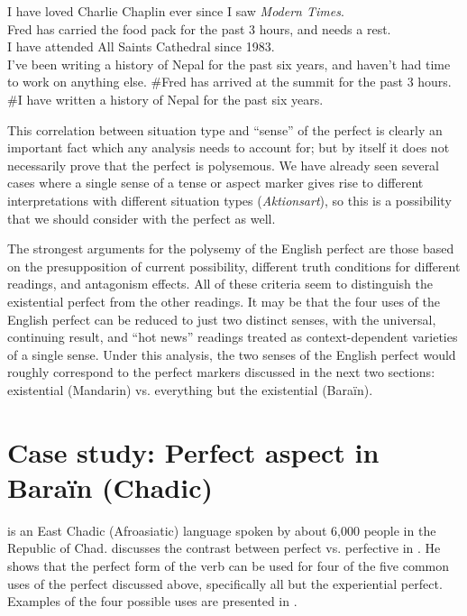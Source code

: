 \ea \label{ex:22.23}
\ea I have loved Charlie Chaplin ever since I saw \textit{Modern Times}.\\
\ex Fred has carried the food pack for the past 3 hours, and needs a rest.\\
\ex I have attended All Saints Cathedral since 1983.\\
\ex I’ve been writing a history of Nepal for the past six years, and haven’t had time to work on anything else.
                       \z
\ex \label{ex:22.24}
\ea \#Fred has arrived at the summit for the past 3 hours.\\
\ex \#I have written a history of Nepal for the past six years.
                       \z
\z


This correlation between situation type and “sense” of the perfect is clearly an important fact which any analysis needs to account for; but by itself it does not necessarily prove that the perfect is polysemous. We have already seen several cases where a single sense of a tense or aspect marker gives rise to different interpretations with different situation types (\textit{Aktionsart}), so this is a possibility that we should consider with the perfect as well.


The strongest arguments for the polysemy of the English perfect are those based on the presupposition of current possibility, different truth conditions for different readings, and antagonism effects. All of these criteria seem to distinguish the existential perfect from the other readings. It may be that the four uses of the English perfect can be reduced to just two distinct senses, with the universal, continuing result, and “hot news” readings treated as context-dependent varieties of a single sense. Under this analysis, the two senses of the English perfect would roughly correspond to the perfect markers discussed in the next two sections: existential (Mandarin) vs. everything but the existential (Baraïn).


\section{Case study: Perfect aspect in Baraïn (Chadic)}\label{sec:22.5}

 is an East Chadic (Afroasiatic) language spoken by about 6,000 people in the Republic of Chad. \citet{Lovestrand2012} discusses the contrast between perfect vs. perfective in . He shows that the perfect form of the verb can be used for four of the five common uses of the perfect discussed above, specifically all but the experiential perfect. Examples of the four possible uses are presented in .



